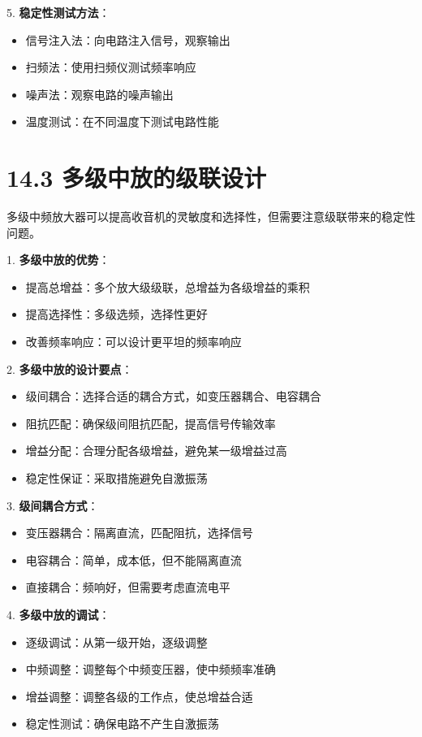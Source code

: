 \documentclass[12pt,UTF8]{ctexbook}
\begin{document}
5. \textbf{稳定性测试方法}：
   \begin{itemize}[leftmargin=3.5em]
   \item 信号注入法：向电路注入信号，观察输出
   \item 扫频法：使用扫频仪测试频率响应
   \item 噪声法：观察电路的噪声输出
   \item 温度测试：在不同温度下测试电路性能
   \end{itemize}

\section*{14.3 多级中放的级联设计}

多级中频放大器可以提高收音机的灵敏度和选择性，但需要注意级联带来的稳定性问题。

1. \textbf{多级中放的优势}：
   \begin{itemize}[leftmargin=3.5em]
   \item 提高总增益：多个放大级级联，总增益为各级增益的乘积
   \item 提高选择性：多级选频，选择性更好
   \item 改善频率响应：可以设计更平坦的频率响应
   \end{itemize}

2. \textbf{多级中放的设计要点}：
   \begin{itemize}[leftmargin=3.5em]
   \item 级间耦合：选择合适的耦合方式，如变压器耦合、电容耦合
   \item 阻抗匹配：确保级间阻抗匹配，提高信号传输效率
   \item 增益分配：合理分配各级增益，避免某一级增益过高
   \item 稳定性保证：采取措施避免自激振荡
   \end{itemize}

3. \textbf{级间耦合方式}：
   \begin{itemize}[leftmargin=3.5em]
   \item 变压器耦合：隔离直流，匹配阻抗，选择信号
   \item 电容耦合：简单，成本低，但不能隔离直流
   \item 直接耦合：频响好，但需要考虑直流电平
   \end{itemize}

4. \textbf{多级中放的调试}：
   \begin{itemize}[leftmargin=3.5em]
   \item 逐级调试：从第一级开始，逐级调整
   \item 中频调整：调整每个中频变压器，使中频频率准确
   \item 增益调整：调整各级的工作点，使总增益合适
   \item 稳定性测试：确保电路不产生自激振荡
   \end{itemize}
\end{document}
